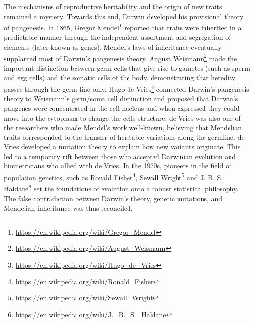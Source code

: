 \documentclass[]{book}
\let\rmarkdownfootnote\footnote%
\def\footnote{\protect\rmarkdownfootnote}
\renewcommand{\href}[2]{#2\footnote{\url{#1}}}
\begin{document}
The mechanisms of reproductive heritability and the origin of new traits remained a mystery. Towards this end, Darwin developed his provisional theory of pangenesis. In 1865, \href{https://en.wikipedia.org/wiki/Gregor_Mendel}{Gregor Mendel} reported that traits were inherited in a predictable manner through the independent assortment and segregation of elements (later known as genes). Mendel's laws of inheritance eventually supplanted most of Darwin's pangenesis theory. \href{https://en.wikipedia.org/wiki/August_Weismann}{August Weismann} made the important distinction between germ cells that give rise to gametes (such as sperm and egg cells) and the somatic cells of the body, demonstrating that heredity passes through the germ line only. \href{https://en.wikipedia.org/wiki/Hugo_de_Vries}{Hugo de Vries} connected Darwin's pangenesis theory to Weismann's germ/soma cell distinction and proposed that Darwin's pangenes were concentrated in the cell nucleus and when expressed they could move into the cytoplasm to change the cells structure. de Vries was also one of the researchers who made Mendel's work well-known, believing that Mendelian traits corresponded to the transfer of heritable variations along the germline. de Vries developed a mutation theory to explain how new variants originate. This led to a temporary rift between those who accepted Darwinian evolution and biometricians who allied with de Vries. In the 1930s, pioneers in the field of population genetics, such as \href{https://en.wikipedia.org/wiki/Ronald_Fisher}{Ronald Fisher}, \href{https://en.wikipedia.org/wiki/Sewall_Wright}{Sewall Wright} and \href{https://en.wikipedia.org/wiki/J._B._S._Haldane}{J. B. S. Haldane} set the foundations of evolution onto a robust statistical philosophy. The false contradiction between Darwin's theory, genetic mutations, and Mendelian inheritance was thus reconciled.
\end{document}
